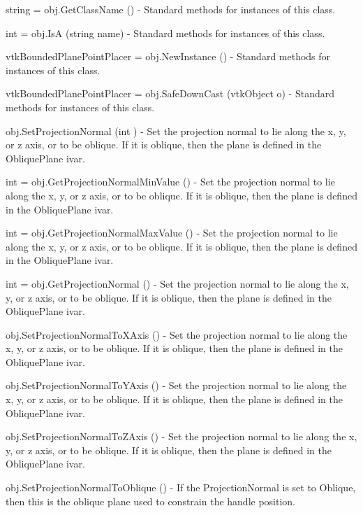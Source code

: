\begin{DoxyItemize}
\item {\ttfamily string = obj.\-Get\-Class\-Name ()} -\/ Standard methods for instances of this class.  
\item {\ttfamily int = obj.\-Is\-A (string name)} -\/ Standard methods for instances of this class.  
\item {\ttfamily vtk\-Bounded\-Plane\-Point\-Placer = obj.\-New\-Instance ()} -\/ Standard methods for instances of this class.  
\item {\ttfamily vtk\-Bounded\-Plane\-Point\-Placer = obj.\-Safe\-Down\-Cast (vtk\-Object o)} -\/ Standard methods for instances of this class.  
\item {\ttfamily obj.\-Set\-Projection\-Normal (int )} -\/ Set the projection normal to lie along the x, y, or z axis, or to be oblique. If it is oblique, then the plane is defined in the Oblique\-Plane ivar.  
\item {\ttfamily int = obj.\-Get\-Projection\-Normal\-Min\-Value ()} -\/ Set the projection normal to lie along the x, y, or z axis, or to be oblique. If it is oblique, then the plane is defined in the Oblique\-Plane ivar.  
\item {\ttfamily int = obj.\-Get\-Projection\-Normal\-Max\-Value ()} -\/ Set the projection normal to lie along the x, y, or z axis, or to be oblique. If it is oblique, then the plane is defined in the Oblique\-Plane ivar.  
\item {\ttfamily int = obj.\-Get\-Projection\-Normal ()} -\/ Set the projection normal to lie along the x, y, or z axis, or to be oblique. If it is oblique, then the plane is defined in the Oblique\-Plane ivar.  
\item {\ttfamily obj.\-Set\-Projection\-Normal\-To\-X\-Axis ()} -\/ Set the projection normal to lie along the x, y, or z axis, or to be oblique. If it is oblique, then the plane is defined in the Oblique\-Plane ivar.  
\item {\ttfamily obj.\-Set\-Projection\-Normal\-To\-Y\-Axis ()} -\/ Set the projection normal to lie along the x, y, or z axis, or to be oblique. If it is oblique, then the plane is defined in the Oblique\-Plane ivar.  
\item {\ttfamily obj.\-Set\-Projection\-Normal\-To\-Z\-Axis ()} -\/ Set the projection normal to lie along the x, y, or z axis, or to be oblique. If it is oblique, then the plane is defined in the Oblique\-Plane ivar.  
\item {\ttfamily obj.\-Set\-Projection\-Normal\-To\-Oblique ()} -\/ If the Projection\-Normal is set to Oblique, then this is the oblique plane used to constrain the handle position.  

\end{DoxyItemize}
